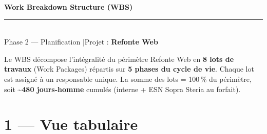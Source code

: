 \documentclass[11pt,a4paper,oneside]{report}
\begin{document}
\small

\begin{center}
{\LARGE\bfseries\color{cnNavy} Work Breakdown Structure (WBS)}\\[4pt]
\textcolor{cnOrange}{\rule{10cm}{1pt}}\\[4pt]
{\large\color{cnSlate} Phase 2 --- Planification \quad|\quad Projet : \textbf{Refonte Web}}
\end{center}

\vspace{6pt}

\begin{finding}
Le WBS décompose l'intégralité du périmètre Refonte Web en \textbf{8 lots de travaux} (Work Packages) répartis sur \textbf{5 phases du cycle de vie}. Chaque lot est assigné à un responsable unique. La somme des lots = 100\,\% du périmètre, soit \textbf{\textasciitilde 480 jours-homme} cumulés (interne + ESN Sopra Steria au forfait).
\end{finding}

\vspace{6pt}

\section*{1 --- Vue tabulaire}
\end{document}
